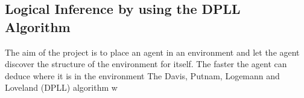 %



\subsection{Logical Inference by using the DPLL Algorithm}
\label{subsec:Inference_DPLL}

The aim of the project is to place an agent in an environment and let the agent discover the structure of the environment for itself. The faster the agent can deduce where it is in the environment The Davis, Putnam, Logemann and Loveland (DPLL) algorithm w



